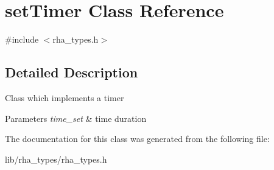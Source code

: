 \hypertarget{classsetTimer}{}\section{set\+Timer Class Reference}
\label{classsetTimer}


{\ttfamily \#include $<$rha\+\_\+types.\+h$>$}



\subsection{Detailed Description}
Class which implements a timer


\begin{DoxyParams}{Parameters}
{\em time\+\_\+set} & time duration \\
\hline
\end{DoxyParams}


The documentation for this class was generated from the following file\+:\begin{DoxyCompactItemize}
\item 
lib/rha\+\_\+types/rha\+\_\+types.\+h\end{DoxyCompactItemize}
